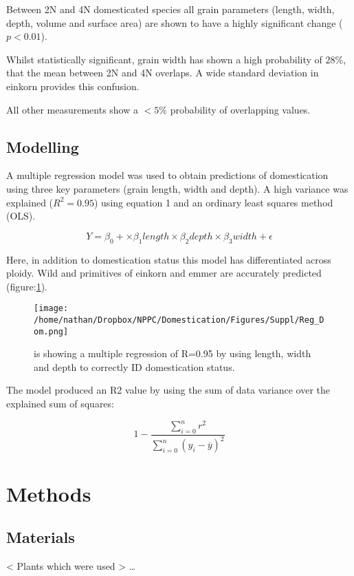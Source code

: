 \documentclass[a4paper, twocolumn]{article}
\begin{document}
Between 2N and 4N domesticated species all grain parameters (length, width, depth, volume and surface area) are shown to have a highly significant change (\(p<0.01\)).

Whilst statistically significant, grain width has shown a high probability of \(28\%\), that the mean between 2N and 4N overlaps. A wide standard deviation in einkorn provides this confusion.

All other measurements show a \(<5\%\) probability of overlapping values.


\subsection{Modelling}
\label{sec:org835f426}

A multiple regression model was used to obtain predictions of domestication using three key parameters (grain length, width and depth). A high variance was explained (\(R^2=0.95\)) using equation 1 and an ordinary least squares method (OLS).

$$ Y = \beta_0 + \times \beta_1 length \times \beta_2 depth \times \beta_3 width  + \epsilon $$

Here, in addition to domestication status this model has differentiated across ploidy. Wild and primitives of einkorn and emmer are accurately predicted (figure:\ref{fig:orgdbcbc30}).

\begin{figure}[htbp]
\centering
\texttt{[image: /home/nathan/Dropbox/NPPC/Domestication/Figures/Suppl/Reg\_Dom.png]}
\caption{\label{fig:orgdbcbc30}
is showing a multiple regression of R=0.95 by using length, width and depth to correctly ID domestication status.}
\end{figure}

The model produced an R2 value by using the sum of data variance over the explained sum of squares:

$$1- \frac{\sum\limits_{i=0}^{n}{r^2}}{\sum\limits_{i=0}^{n}{(y_i - \overline{y})^2 }}$$



\section{Methods}
\label{sec:orgc1d55d7}
\subsection{Materials}
\label{sec:org8b605ea}
< Plants which were used > \ldots{}
\end{document}
